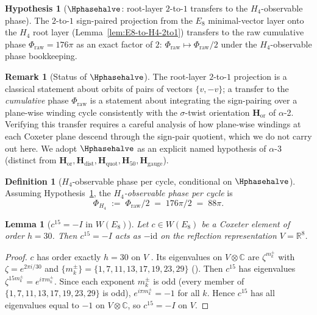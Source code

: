 \documentclass[11pt, a4paper]{amsart}
\newtheorem{lemma}[theorem]{Lemma}
\theoremstyle{definition}
\newtheorem{definition}[theorem]{Definition}
\newtheorem{remark}[theorem]{Remark}
\newtheorem{hypothesis}[theorem]{Hypothesis}
\newcommand{\R}{\mathbb{R}}
\newcommand{\C}{\mathbb{C}}
\newcommand{\Hor}{\mathbf{H}_{\mathrm{or}}}
\newcommand{\Hdist}{\mathbf{H}_{\mathrm{dist}}}
\newcommand{\Hquot}{\mathbf{H}_{\mathrm{quot}}}
\newcommand{\Hfifty}{\mathbf{H}_{50}}
\newcommand{\Hgauge}{\mathbf{H}_{\mathrm{gauge}}}
\newcommand{\Phiraw}{\Phi_{\mathrm{raw}}}
\newcommand{\PhiHfour}{\Phi_{H_4}}
\begin{document}
\begin{hypothesis}[$\Hphasehalve$: root-layer $2$-to-$1$ transfers to the $H_4$-observable phase]
\label{hyp:phase-halving}
The $2$-to-$1$ sign-paired projection from the $E_8$
minimal-vector layer onto the $H_4$ root layer
(Lemma~\ref{lem:E8-to-H4-2to1}) transfers to the raw cumulative
phase $\Phiraw = 176\pi$ as an exact factor of $2$:
$\Phiraw \mapsto \Phiraw / 2$ under the $H_4$-observable phase
bookkeeping.
\end{hypothesis}

\begin{remark}[Status of $\Hphasehalve$]
\label{rmk:phase-halving-status}
The root-layer $2$-to-$1$ projection is a classical statement
about orbits of pairs of vectors $\{v, -v\}$; a transfer to the
\emph{cumulative} phase $\Phiraw$ is a statement about
integrating the sign-pairing over a plane-wise winding cycle
consistently with the $\sigma$-twist orientation $\Hor$ of
$\alpha$-2. Verifying this transfer requires a careful analysis
of how plane-wise windings at each Coxeter plane descend
through the sign-pair quotient, which we do not carry out
here. We adopt $\Hphasehalve$ as an explicit named hypothesis
of $\alpha$-3 (distinct from $\Hor, \Hdist, \Hquot, \Hfifty,
\Hgauge$).
\end{remark}

\begin{definition}[$H_4$-observable phase per cycle, conditional on $\Hphasehalve$]
\label{def:phi-H4}
Assuming Hypothesis~\ref{hyp:phase-halving}, the
\emph{$H_4$-observable phase per cycle} is
\[
  \PhiHfour \;:=\; \Phiraw / 2 \;=\; 176\pi / 2 \;=\; 88\pi.
\]
\end{definition}

\begin{lemma}[$c^{15} = -I$ in $W(E_8)$]
\label{lem:c15}
Let $c \in W(E_8)$ be a Coxeter element of order $h = 30$.
Then $c^{15} = -I$ acts as $-\mathrm{id}$ on the reflection
representation $V = \R^8$.
\end{lemma}

\begin{proof}
$c$ has order exactly $h = 30$ on $V$
\cite[\S 3.18]{Humphreys}. Its eigenvalues on $V \otimes \C$
are $\zeta^{m_k^\pm}$ with $\zeta = e^{2\pi i / 30}$ and
$\{m_k^\pm\} = \{1, 7, 11, 13, 17, 19, 23, 29\}$
(\cite[Lem.~lem:E8-data]{CascadePhasonCoxeter}). Then
$c^{15}$ has eigenvalues $\zeta^{15 m_k^\pm} = e^{i \pi
m_k^\pm}$. Since each exponent $m_k^\pm$ is odd (every
member of $\{1, 7, 11, 13, 17, 19, 23, 29\}$ is odd),
$e^{i \pi m_k^\pm} = -1$ for all $k$. Hence $c^{15}$ has
all eigenvalues equal to $-1$ on $V \otimes \C$, so
$c^{15} = -I$ on $V$.
\end{proof}
\end{document}
